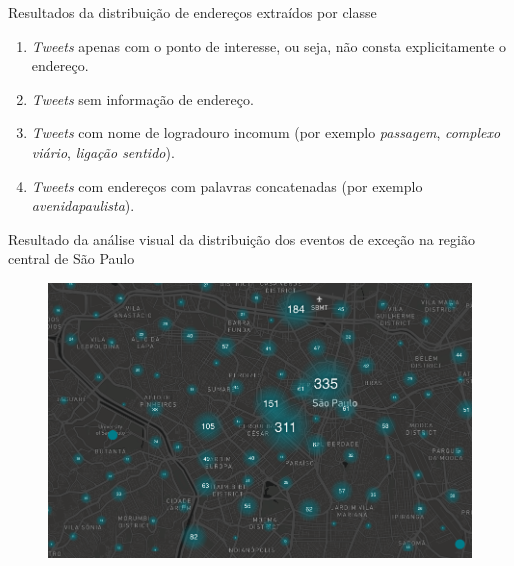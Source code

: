 \documentclass{beamer}
\begin{document}
\begin{frame}{Resultados da distribuição de endereços extraídos por classe}
\begin{enumerate}
\item \textit{Tweets} apenas com o ponto de interesse, ou seja, não consta explicitamente o endereço.
\item \textit{Tweets} sem informação de endereço.
\item \textit{Tweets} com nome de logradouro incomum (por exemplo \emph{passagem}, \emph{complexo viário}, \emph{ligação sentido}).
\item \textit{Tweets} com endereços com palavras concatenadas (por exemplo \emph{avenidapaulista}).
\end{enumerate}
\end{frame}
\begin{frame}{Resultado da análise visual da distribuição dos eventos de exceção na região central de São Paulo}
\begin{figure}[!htb]%
	\centering
		\includegraphics[width=0.85\linewidth]{exception_events_sp.png}
	\label{fig:pizza_bus}
\end{figure}
\end{frame}
\end{document}

